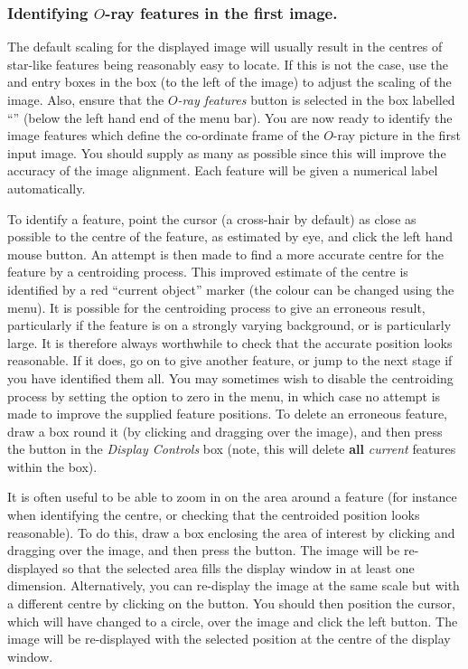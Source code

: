 \subsubsection {Identifying $O$-ray features in the first image.}
The default scaling for the displayed image will usually result in the
centres of star-like features being reasonably easy to locate. If this is
not the case, use the  and 
 entry boxes
in the  box
(to the left of the image) to adjust the scaling of the image. Also,
ensure that the {\em $O$-ray features} button is selected in the box
labelled ``'' (below the left hand
end of the menu bar). You are now ready to identify the image features
which define the co-ordinate frame of the $O$-ray picture in the first
input image. You should supply as many as possible since this will
improve the accuracy of the image alignment. Each feature will be given a
numerical label automatically.

To identify a feature, point the cursor (a cross-hair by default) as
close as possible to the centre of the feature, as estimated by eye, and
click the left hand mouse button. An attempt is then made to find a more
accurate centre for the feature by a centroiding process. This improved
estimate of the centre is identified by a red ``current object'' marker
(the colour can be changed using the  menu). It is possible for the centroiding
process to give an erroneous result, particularly if the feature is on a
strongly varying background, or is particularly large. It is therefore
always worthwhile to check that the accurate position looks reasonable.
If it does, go on to give another feature, or jump to the next stage if
you have identified them all. You may sometimes wish to disable the
centroiding process by setting the  option to zero in the  menu, in which case no attempt is made to
improve the supplied feature positions. To delete an erroneous feature,
draw a box round it (by clicking and dragging over the image), and then
press the  button in the {\em
Display Controls} box (note, this will delete {\bf all} {\em current}
features within the box).

It is often useful to be able to zoom in on the area around a feature
(for instance when identifying the centre, or checking that the
centroided position looks reasonable). To do this, draw a box enclosing
the area of interest by clicking and dragging over the image, and then
press the  button. The image will be
re-displayed so that the selected area fills the display window in at
least one dimension. Alternatively, you can re-display the image at the
same scale but with a different centre by clicking on the  button. You should then position the cursor,
which will have changed to a circle, over the image and click the
left button. The image will be re-displayed with the selected position at
the centre of the display window.

